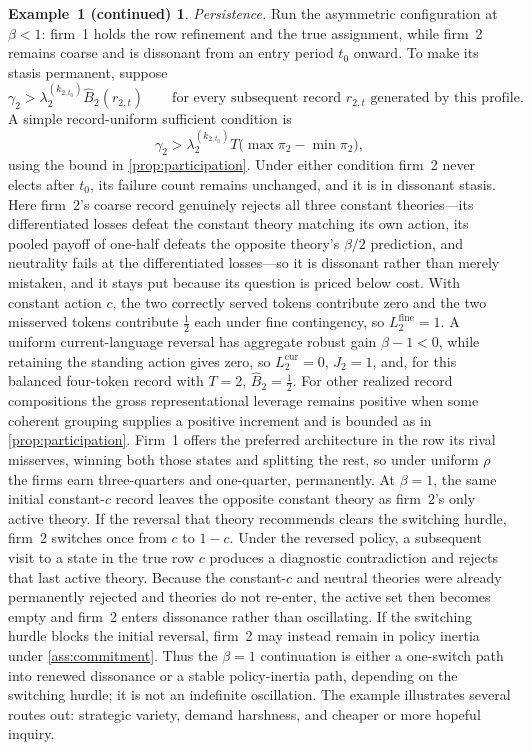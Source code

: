 \documentclass[11pt]{article}
\theoremstyle{definition}
\newtheorem*{excont}{Example~1 (continued)}
\begin{document}
\begin{excont}
\emph{Persistence.}
Run the asymmetric configuration at \(\beta<1\): firm~1 holds the row refinement and the true assignment, while firm~2 remains coarse and is dissonant from an entry period \(t_0\) onward.
To make its stasis permanent, suppose
\[
\gamma_2
>
\lambda_2^{(k_{2,t_0})}
\widehat B_2(r_{2,t})
\qquad
\text{for every subsequent record \(r_{2,t}\) generated by this profile.}
\]
A simple record-uniform sufficient condition is
\[
\gamma_2
>
\lambda_2^{(k_{2,t_0})}
T\bigl(\max\pi_2-\min\pi_2\bigr),
\]
using the bound in \cref{prop:participation}.
Under either condition firm~2 never elects after \(t_0\), its failure count remains unchanged, and it is in dissonant stasis.
Here firm~2's coarse record genuinely rejects all three constant theories---its differentiated losses defeat the constant theory matching its own action, its pooled payoff of one-half defeats the opposite theory's $\beta/2$ prediction, and neutrality fails at the differentiated losses---so it is dissonant rather than merely mistaken, and it stays put because its question is priced below cost.
With constant action $c$, the two correctly served tokens contribute zero and the two misserved tokens contribute $\tfrac12$ each under fine contingency, so $L_2^{\mathrm{fine}}=1$.
A uniform current-language reversal has aggregate robust gain $\beta-1<0$, while retaining the standing action gives zero, so $L_2^{\mathrm{cur}}=0$, $J_2=1$, and, for this balanced four-token record with $T=2$, $\widehat B_2=\tfrac12$.
For other realized record compositions the gross representational leverage remains positive when some coherent grouping supplies a positive increment and is bounded as in \cref{prop:participation}.
Firm~1 offers the preferred architecture in the row its rival misserves, winning both those states and splitting the rest, so under uniform $\rho$ the firms earn three-quarters and one-quarter, permanently.
At \(\beta=1\), the same initial constant-\(c\) record leaves the opposite constant theory as firm~2's only active theory.
If the reversal that theory recommends clears the switching hurdle, firm~2 switches once from \(c\) to \(1-c\).
Under the reversed policy, a subsequent visit to a state in the true row \(c\) produces a diagnostic contradiction and rejects that last active theory.
Because the constant-\(c\) and neutral theories were already permanently rejected and theories do not re-enter, the active set then becomes empty and firm~2 enters dissonance rather than oscillating.
If the switching hurdle blocks the initial reversal, firm~2 may instead remain in policy inertia under \cref{ass:commitment}.
Thus the \(\beta=1\) continuation is either a one-switch path into renewed dissonance or a stable policy-inertia path, depending on the switching hurdle; it is not an indefinite oscillation.
The example illustrates several routes out: strategic variety, demand harshness, and cheaper or more hopeful inquiry.
\end{excont}
\end{document}
